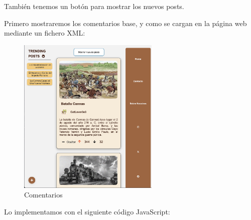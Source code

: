 \documentclass{article}
\begin{document}
También tenemos un botón para mostrar los nuevos posts.

Primero mostraremos los comentarios base, y como se cargan en la página web mediante un fichero XML:

\begin{figure}[H]
    \centering
    \includegraphics[width=0.6\textwidth]{jsFotos/comentarios.jpg}
    \caption{Comentarios}
    \label{fig:foro_interface}
\end{figure}

Lo implementamos con el siguiente código JavaScript:
\end{document}
